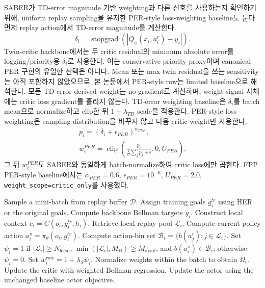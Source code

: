 \documentclass[letterpaper]{article}
\begin{document}
SABER가 TD-error magnitude 기반 weighting과 다른 신호를 사용하는지 확인하기 위해, uniform replay sampling을 유지한 PER-style loss-weighting baseline도 둔다. 먼저 replay action에서 TD-error magnitude를 계산한다.
\begin{equation}
\delta_i =
\operatorname{stopgrad}
\left(
|Q_\phi(x_i,a_i^r)-y_i|
\right).
\end{equation}
Twin-critic backbone에서는 두 critic residual의 minimum absolute error를 logging/priority용 \(\delta_i\)로 사용한다. 이는 conservative priority proxy이며 canonical PER 구현의 유일한 선택은 아니다. Mean 또는 max twin residual을 쓰는 sensitivity는 아직 포함하지 않았으므로, 본 논문에서 PER-style row는 limited baseline으로 해석한다. 모든 TD-error-derived weight는 no-gradient로 계산하며, weight signal 자체에는 critic loss gradient를 흘리지 않는다. TD-error weighting baseline은 \(\delta_i\)를 batch mean으로 normalize하고 clip한 뒤 \(1+\lambda_{TD}\) scale을 적용한다. PER-style loss weighting은 sampling distribution을 바꾸지 않고 다음 critic weight만 사용한다.
\begin{equation}
\begin{aligned}
p_i=(\delta_i+\epsilon_{PER})^{\alpha_{PER}},
\\
w_i^{PER}=\operatorname{clip}
\left(
\frac{p_i}{\frac{1}{B}\sum_j p_j+\epsilon},
0,
U_{PER}
\right).
\end{aligned}
\end{equation}
그 뒤 \(w_i^{PER}\)도 SABER와 동일하게 batch-normalize하여 critic loss에만 곱한다. FPP PER-style baseline에서는 \(\alpha_{PER}=0.6\), \(\epsilon_{PER}=10^{-6}\), \(U_{PER}=2.0\), \texttt{weight\_scope=critic\_only}를 사용했다.

\begin{algorithm}[tb]
\caption{SABER Critic Update}
\label{alg:saber}
\begin{algorithmic}[1]
\STATE Sample a mini-batch from replay buffer \(\mathcal D\).
\STATE Assign training goals \(g_i^{tr}\) using HER or the original goals.
\STATE Compute backbone Bellman targets \(y_i\).
    \STATE Construct local context \(c_i=C(o_i,g_i^{tr},h_i)\).
    \STATE Retrieve local replay pool \(\mathcal L_i\).
    \STATE Compute current policy action \(a_i^\pi=\pi_\theta(o_i,g_i^{tr})\).
    \STATE Compute action-bin set \(\mathcal B_i=\{b(a_j^r):j\in\mathcal L_i\}\).
    \STATE Set \(\psi_i=1\) if \(|\mathcal L_i|\ge N_{\mathrm{local}}\), \(\min(|\mathcal L_i|,M_B)\ge M_{\mathrm{avail}}\), and \(b(a_i^\pi)\in\mathcal B_i\); otherwise \(\psi_i=0\).
    \STATE Set \(w_i^{raw}=1+\lambda_S\psi_i\).
\ENDFOR
\STATE Normalize weights within the batch to obtain \(\Omega_i\).
\STATE Update the critic with weighted Bellman regression.
\STATE Update the actor using the unchanged baseline actor objective.
\end{algorithmic}
\end{algorithm}
\end{document}
